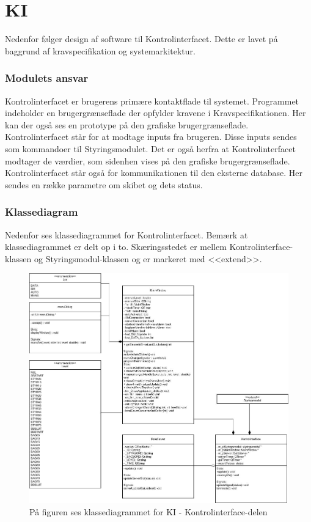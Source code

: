\chapter{KI}
Nedenfor følger design af software til Kontrolinterfacet. Dette er lavet på baggrund af kravspecifikation og systemarkitektur. 
\subsection{Modulets ansvar}
Kontrolinterfacet er brugerens primære kontaktflade til systemet. Programmet indeholder en brugergrænseflade der opfylder kravene i Kravspecifikationen. Her kan der også ses en prototype på den grafiske brugergrænseflade.
Kontrolinterfacet står for at modtage inputs fra brugeren. Disse inputs sendes som kommandoer til Styringsmodulet. Det er også herfra at Kontrolinterfacet modtager de værdier, som sidenhen vises på den grafiske brugergrænseflade. Kontrolinterfacet står også for kommunikationen til den eksterne database. Her sendes en række parametre om skibet og dets status.
\subsection{Klassediagram}
Nedenfor ses klassediagrammet for Kontrolinterfacet. Bemærk at klassediagrammet er delt op i to. Skæringsstedet er mellem Kontrolinterface-klassen og Styringsmodul-klassen og er markeret med <<extend>>.

\begin{figure}[H]
\centering
\includegraphics[width=1\textwidth]{billeder/KI-Class}
\caption{På figuren ses klassediagrammet for KI - Kontrolinterface-delen}
\end{figure}

